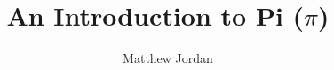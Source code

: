 \documentclass[11pt,titlepage]{article}
\title{An Introduction to Pi ($\pi$)\vspace{-0.5cm}}
\author{Matthew Jordan}
\date{\today\vspace{2cm}\begin{center}
\texttt{[image: Pi]}
\end{center}}
\begin{document}
\maketitle
\begin{comment}
\section*{Preface}

Hi there! First off, let me just say that I am exceptionally flattered that you have decided to read this ol' thang. I really appreciate that you've even made it this far. I'm not sure what it would best be called -- book? article? magnum opus? -- but these musings are my first foray into writing about math, a pursuit I hope to continue for at least a lifetime.

There are a few important things I figure I ought to mention before we get this thing going. First off, I haven't really written for any specific audience here. Admittedly, there are some parts of this book (especially in the second half) that will unquestionably baffle folks who haven't taken some university level math. But don't let potentially intimidating symbols deter you from reading this in full; the historical content and mathematical intuition are totally accessible. I've made a very conscientious effort to use very little technical language, often at the expense of brevity. But I think that being understood is far more important than being concise, so hopefully what I lack in terseness I make up for in clarity. 

Second, you'll very quickly notice that I'm not an expert in graphic design, nor am I particularly skilled at making things look pretty. Fortunately, \LaTeX (the program that makes math look beautiful) does most of the formatting for me. That being said, I'm really just getting started on \LaTeX, so I still have much to learn and would love love love any advice on how to improve.

Third, I should probably talk a bit about references. I admittedly haven't been all that careful with references and citations here. Most of the information can be found (and is properly sourced) on Wikipedia or Wolfram, and I promise it's all legit. Perhaps in the second edition I'll have a bibliography. In the interest of humour I have bended some historical information, but none of the math has been modified for comedic purposes. 

Finally, I want to thank a few people who helped me out with this project. The whole inspiration for this came from David Laing, who at the beginning of the summer of 2014 asked me to teach him any topics in math of my choosing. I decided that $\pi$ would be a fun subject, and figured it would be a good idea to write everything down so I wouldn't forget it, and now here we are! So thank you, David, for giving me the opportunity to teach a subject of my own choosing to a very receptive audience. 


\end{comment}
\end{document}

